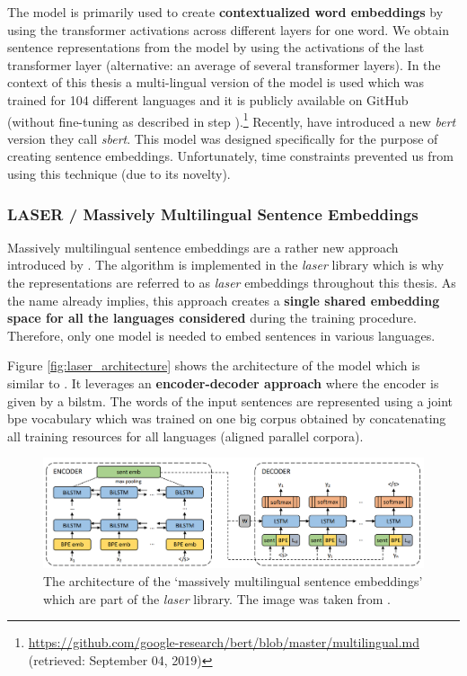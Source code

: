 The model is primarily used to create \textbf{contextualized word embeddings} by using the transformer activations across different layers for one word. We obtain sentence representations from the model by using the activations of the last transformer layer (alternative: an average of several transformer layers). In the context of this thesis a multi-lingual version of the model is used which was trained for 104 different languages and it is publicly available on GitHub\github~ (without fine-tuning as described in step ).\footnote{\url{https://github.com/google-research/bert/blob/master/multilingual.md} (retrieved: September 04, 2019)} Recently, \citep{Reimers.2019} have introduced a new \textit{\gls{bert}} version they call \textit{\gls{sbert}}. This model was designed specifically for the purpose of creating sentence embeddings. Unfortunately, time constraints prevented us from using this technique (due to its novelty).

\subsubsection{LASER / Massively Multilingual Sentence Embeddings}
\label{sec:laser}

Massively multilingual sentence embeddings are a rather new approach introduced by \citep{Artetxe.2018}. The algorithm is implemented in the \textit{\gls{laser}} library which is why the representations are referred to as \textit{\gls{laser}} embeddings throughout this thesis. As the name already implies, this approach creates a \textbf{single shared embedding space for all the languages considered} during the training procedure. Therefore, only one model is needed to embed sentences in various languages.

Figure \vref{fig:laser_architecture} shows the architecture of the model which is similar to \citep{Schwenk.2018}. It leverages an \textbf{encoder-decoder approach} where the encoder is given by a \gls{bilstm}. The words of the input sentences are represented using a joint \gls{bpe} vocabulary which was trained on one big corpus obtained by concatenating all training resources for all languages (aligned parallel corpora).

\begin{figure}[h]
	\centering
	\includegraphics[scale=0.3]{images/laser_architecture}
	\caption[\textit{LASER} encoder architecture]
		{The architecture of the `massively multilingual sentence embeddings' which are part of the \textit{\gls{laser}} library.
		The image was taken from \citep{Artetxe.2018}.}
	\label{fig:laser_architecture}
\end{figure}

